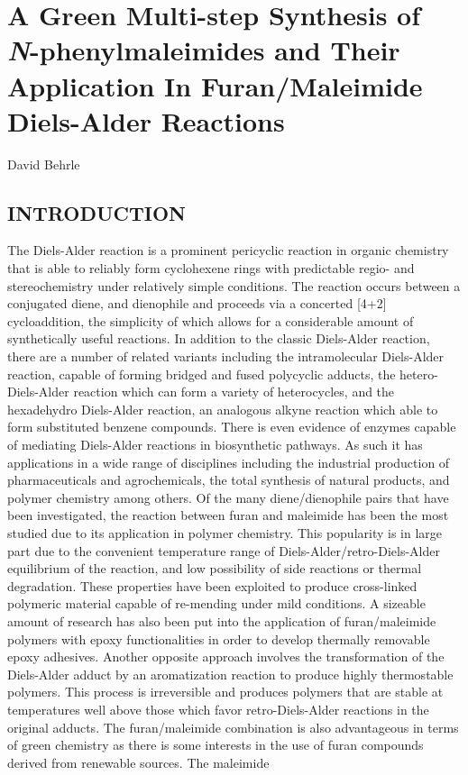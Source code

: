 \documentclass[11pt]{article}
\begin{document}
\linespread{1.25}
\raggedright
\setlength{\parskip}{2pt}
\setlength{\belowcaptionskip}{-8pt}
\def\citenumfont{\textnormal}
\renewcommand{\bibsection}{}

\section*{A Green Multi-step Synthesis of \textit{N}-phenylmaleimides and Their Application In Furan/Maleimide Diels-Alder Reactions}
David Behrle

\subsection*{INTRODUCTION}
The Diels-Alder reaction is a prominent pericyclic reaction in organic chemistry that is able to reliably form cyclohexene rings with predictable regio- and stereochemistry under relatively simple conditions.\cite{Brocksom2001} The reaction occurs between a conjugated diene, and dienophile and proceeds via a concerted [4+2] cycloaddition, the simplicity of which allows for a considerable amount of synthetically useful reactions.\cite{Nicolaou2002} In addition to the classic Diels-Alder reaction, there are a number of related variants including the intramolecular Diels-Alder reaction, capable of forming bridged and fused polycyclic adducts, the hetero-Diels-Alder reaction which can form a variety of heterocycles, and the hexadehydro Diels-Alder reaction, an analogous alkyne reaction which able to form substituted benzene compounds.\cite{Heravi2015,Hoye2012} There is even evidence of enzymes capable of mediating Diels-Alder reactions in biosynthetic pathways.\cite{Stocking2003} As such it has applications in a wide range of disciplines including the industrial production of pharmaceuticals and agrochemicals, the total synthesis of natural products, and polymer chemistry among others.\cite{Funel2013,Nicolaou2002,Briou2021}  Of the many diene/dienophile pairs that have been investigated, the reaction between furan and maleimide has been the most studied due to its application in polymer chemistry.\cite{Briou2021} This popularity is in large part due to the convenient temperature range of Diels-Alder/retro-Diels-Alder equilibrium of the reaction, and low possibility of side reactions or thermal degradation.\cite{Gandini2013} These properties have been exploited to produce cross-linked polymeric material capable of re-mending under mild conditions.\cite{Chen2002} A sizeable amount of research has also been put into the application of furan/maleimide polymers with epoxy functionalities in order to develop thermally removable epoxy adhesives.\cite{Mcelhanon2002} Another opposite approach involves the transformation of the Diels-Alder adduct by an aromatization reaction to produce highly thermostable polymers.\cite{Gandini2013} This process is irreversible and produces polymers that are stable at temperatures well above those which favor retro-Diels-Alder reactions in the original adducts.\cite{Tesoro1986} The furan/maleimide combination is also advantageous in terms of green chemistry as there is some interests in the use of furan compounds derived from renewable sources.\cite{Gandini2008} The maleimide 
\end{document}
